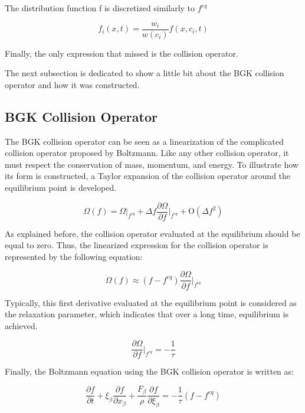 The distribution function f is discretized similarly to $f^{eq}$ 

\begin{equation}
	f_i(x,t) = \frac{w_i}{w(c_i)}f(x, c_i,t)
\end{equation}

Finally, the only expression that missed is the collision operator.

The next subsection is dedicated to show a little bit about the BGK
collision operator and how it was constructed.

\subsection{BGK Collision Operator}

The BGK collision operator can be seen as a linearization of the complicated
collision operator proposed by Boltzmann. Like any other collision operator, it
must respect the conservation of mass, momentum, and energy. To illustrate how
its form is constructed, a Taylor expansion of the collision operator around the
equilibrium point is developed.

\begin{equation}
	\Omega(f) = \Omega|_{f^{eq}} 
	+ \Delta f \frac{\partial \Omega}{\partial f} \bigg|_{f^{eq}} 
	+ \mathrm{O}(\Delta f^2)
\end{equation}

As explained before, the collision operator evaluated at the equilibrium should
be equal to zero. Thus, the linearized expression for the collision operator is
represented by the following equation:

\begin{equation}
	\Omega(f) \approx 
	(f - f^{eq}) \frac{\partial \Omega}{\partial f} \bigg|_{f^{eq}} 
\end{equation}

Typically, this first derivative evaluated at the equilibrium point is
considered as the relaxation parameter, which indicates that over a long time,
equilibrium is achieved.

\begin{equation}
	\frac{\partial \Omega}{\partial f} \bigg|_{f^{eq}} = -\frac{1}{\tau}	
\end{equation}

Finally, the Boltzmann equation using the BGK collision operator is written as:

\begin{equation}
	\frac{\partial f}{\partial t} 
	+ \xi_{\beta} \frac{\partial f}{\partial x_{\beta}}
	+ \frac{F_{\beta}}{\rho} \frac{\partial f}{\partial \xi_{\beta}} = -\frac{1}{\tau}(f - f^{eq})
\end{equation}



